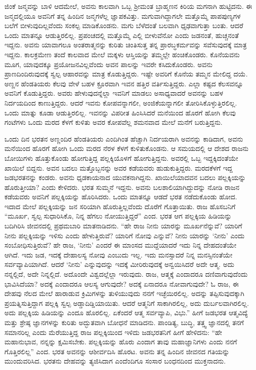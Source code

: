 ಜಿಂಕೆ ಜನ್ಮವನ್ನು ಬಾಳಿ ಆದಮೇಲೆ, ಅವನು ಕಾಲವಾಗಿ ಒಬ್ಬ ಶ‍್ರೀಮಂತ ಬ್ರಾಹ್ಮಣನ ಕಿರಿಯ ಮಗನಾಗಿ ಹುಟ್ಟಿದನು. ಈ ಜನ್ಮದಲ್ಲಿಯೂ ಅವನಿಗೆ ತನ್ನ ಹಿಂದಿನ ಜನ್ಮಗಳೆಲ್ಲ ಜ್ಞಾಪಕವಿತ್ತು. ಮಗುವಾಗಿದ್ದಾಗಲೇ ಮತ್ತೊಮ್ಮೆ ಪಾಪಪುಣ್ಯಗಳ ಬಲೆಗೆ ಬೀಳುವು\-ದಿಲ್ಲವೆಂದು ಸಂಕಲ್ಪ ಮಾಡಿಕೊಂಡನು. ಮಗು ಬೆಳೆದಂತೆ ಬಲವಾಗಿ ಧೃಢವಾಗುತ್ತಾ ಬಂತು. ಆದರೆ ಒಂದು ಮಾತನ್ನೂ ಆಡುತ್ತಿರಲಿಲ್ಲ. ಪ್ರಪಂಚದಲ್ಲಿ ಮತ್ತೊಮ್ಮೆ ಎಲ್ಲಿ ಬೀಳುವೆನೋ ಎಂದು ಜಡನಂತೆ, ಹುಚ್ಚನಂತೆ ಇದ್ದನು. ಅವನು ಯಾವಾಗಲೂ ಅಂತರಾತ್ಮನನ್ನು ಕುರಿತು ಚಿಂತಿಸುತ್ತ ತನ್ನ ಪ್ರಾರಬ್ಧಕರ್ಮವನ್ನು ಸವೆಸುವುದಕ್ಕೆ ಮಾತ್ರ ಇದ್ದನು. ಕಾಲಕ್ರಮೇಣ ತಂದೆ ಕಾಲವಾದ ಮೇಲೆ ಮಕ್ಕಳು ಆಸ್ತಿಯನ್ನು ತಮ್ಮಲ್ಲೇ ಹಂಚಿಕೊಂಡರು. ಕೊನೆಯವನು ಮೂಗ, ಯಾವುದಕ್ಕೂ ಪ್ರಯೋಜನವಿಲ್ಲವೆಂದು ಅವನ ಪಾಲನ್ನು ಇವರೇ ಕಸಿದುಕೊಂಡರು. ಅವನು ಪ್ರಾಣದಿಂದಿರುವುದಕ್ಕೆ ಸ್ವಲ್ಪ ಆಹಾರವನ್ನು ಮಾತ್ರ ಕೊಡು\-ತ್ತಿದ್ದರು. ಇಷ್ಟೇ ಅವರಿಗೆ ಕೊನೆಯ ತಮ್ಮನ ಮೇಲಿದ್ದ ದಯೆ. ಅಣ್ಣನ ಹೆಂಡತಿಯರು ಕೆಲವು ವೇಳೆ ಬಹಳ ಕ್ರೂರವಾಗಿ ಇವನ ಹತ್ತಿರ ವರ್ತಿಸುತ್ತಿದ್ದರು. ಎಲ್ಲಾ ಕಷ್ಟದ ಕೆಲಸವನ್ನೂ ಅವನಿಗೆ ಕೊಡುತ್ತಿದ್ದರು. ಅವರು ಹೇಳುವುದನ್ನೆಲ್ಲಾ ಇವನಿಗೆ ಮಾಡಲು ಅಸಾಧ್ಯವಾದರೆ ಅವನನ್ನು ಬಹಳ ನಿರ್ದಯದಿಂದ ಕಾಣುತ್ತಿದ್ದರು. ಆದರೆ ಇವನು ಕೋಪವನ್ನಾಗಲೀ, ಅಂಜಿಕೆಯನ್ನಾಗಲೀ ತೋರಿಸಿಕೊಳ್ಳುತ್ತಿರಲಿಲ್ಲ. ಒಂದು ಮಾತ್ನು ಕೂಡಾ ಆಡುತ್ತಿರಲಿಲ್ಲ. ಇವನನ್ನು ವಿಪರೀತ ಹಿಂಸಿಸಿದರೆ ಮನೆಯಿಂದ ಹೊರಗೆ ಹೋಗಿ ಕೆಲವು ಗಂಟೆಗಳು ಒಂದು ಮರದ ಕೆಳಗೆ ಕುಳಿತು ಅವರ ಕೋಪವೆಲ್ಲ ಶಮನವಾದ ಮೇಲೆ ಮನೆಗೆ ಬರುತ್ತಿದ್ದನು.

ಒಂದು ದಿನ ಭರತನ ಅಣ್ಣಂದಿರ ಹೆಂಡತಿಯರು ಎಂದಿಗಿಂತ ಹೆಚ್ಚಾಗಿ ನಿರ್ದಯರಾಗಿ ಅವನನ್ನು ಕಾಡಿದಾಗ, ಅವನು ಮನೆಯಿಂದ ಹೊರಗೆ ಹೋಗಿ ಒಂದು ಮರದ ನೆರಳ ಕೆಳಗೆ ಕುಳಿತುಕೊಂಡನು. ಆ ಸಮಯದಲ್ಲಿ ಆ ದೇಶದ ರಾಜನು ಬೋಯಿಗಳು ಹೊತ್ತುಕೊಂಡು ಹೋಗುತ್ತಿದ್ದ ಪಲ್ಲಕ್ಕಿಯೊಳಗೆ ಹೋಗುತ್ತಿದ್ದನು. ಅವರಲ್ಲಿ ಒಬ್ಬ ಇದ್ದಕ್ಕಿದಂತೆಯೇ ಖಾಯಿಲೆ ಬಿದ್ದನು. ಅವನ ಬದಲು ಮತ್ತೊಬ್ಬನನ್ನು ಅವರ ಕಡೆಯವರು ಹುಡುಕುತ್ತಿದ್ದರು. ಮರದಕೆಳಗೆ ಇದ್ದ ಜಡಭರತನನ್ನು ಕಂಡರು. ಅವನು ಧೃಡಕಾಯನಾದ ಯುವಕನಾಗಿದ್ದನು. ಖಾಯಿಲೆಯಾದವನ ಬದಲು ಪಲ್ಲಕ್ಕಿಯನ್ನು ಹೊರುತ್ತೀಯಾ? ಎಂದು ಕೇಳಿದರು. ಭರತ ಸುಮ್ಮನೆ ಇದ್ದನು. ಅವನು ಬಲಶಾಲಿಯಾಗಿದ್ದುದನ್ನು ನೋಡಿ ರಾಜನ ಕಡೆಯವರು ಅವನಿಗೆ ಪಲ್ಲಕ್ಕಿಯನ್ನು ಹೊರಿಸಿದರು. ಒಂದು ಮಾತನ್ನೂ ಆಡದೆ ಭರತ ನಡೆದುಕೊಂಡು ಹೋದ. ಇದಾದ ಮೇಲೆ ಪಲ್ಲಕ್ಕಿಯನ್ನು ಜನ ಸರಿಯಾಗಿ ಹೊರುತ್ತಿಲ್ಲವೆಂದು ದೊರೆಗೆ ಗೊತ್ತಾಯಿತು. ರಾಜ ಹೊಸಬನಿಗೆ “ಮೂರ್ಖ, ಸ್ವಲ್ಪ ಸುಧಾರಿಸಿಕೊ, ನಿನ್ನ ಹೆಗಲು ನೋಯುತ್ತಿದ್ದರೆ” ಎಂದ. ಭರತ ಆಗ ಪಲ್ಲಕ್ಕಿಯ ಹಿಡಿಯನ್ನು ಬದಿಗಿರಿಸಿ ಜೀವನದಲ್ಲಿ ಪ್ರಥಮಬಾರಿ ಮಾತನಾಡಿದನು. “ಹೇ ರಾಜ ನೀನು ಯಾರನ್ನು ಮೂರ್ಖನೆನ್ನುವೆ? ಯಾರಿಗೆ ನೀನು ಪಲ್ಲಕ್ಕಿಯನ್ನು ಇಳಿಸು ಎಂದು ಹೇಳುತ್ತಿರುವೆ? ಯಾರಿಗೆ ನೋವು ಎನ್ನುವೆ? ನೀನು ಯಾರನ್ನು ‘ನೀನು’ ಎಂದು ಸಂಬೋಧಿಸುತ್ತಿರುವೆ? ಹೇ ರಾಜ, ‘ನೀನು’ ಎಂದರೆ ಈ ಮಾಂಸದ ಮುದ್ದೆಯಾದರೆ ಇದು ನಿನ್ನ ದೇಹದಂತೆಯೇ ಆಗಿದೆ. ಇದು ಜಡ, ಇದಕ್ಕೆ ದೇಹಾಲಸ್ಯ ನೋವು ಎಂಬುದು ಇಲ್ಲ. ಇದು ಮನಸ್ಸಾದರೆ ನಿನ್ನ ಮನಸ್ಸಿನಂತೆಯೇ ಸರ್ವವ್ಯಾಪಿಯಾಗಿದೆ. ಆದರೆ ‘ನೀನು’ ಎನ್ನುವುದನ್ನು ಇದಕ್ಕೆ ಮೀರಿರುವುದಕ್ಕೆ ಅನ್ವಯಿಸಿದರೆ ಅದೇ ಆತ್ಮ. ಅದು ನನ್ನಲ್ಲಿದೆ, ಅದೇ ನಿನ್ನಲ್ಲಿದೆ. ಅದೊಂದೇ ವಿಶ್ವದಲ್ಲೆಲ್ಲಾ ಇರುವುದು. ರಾಜ, ಆತ್ಮಕ್ಕೆ ಎಂದಾದರೂ ದಣಿವಾಗುವುದೆಂದು ಭಾವಿಸಿದೆಯಾ? ಅದಕ್ಕೆ ಎಂದಾದರೂ ಆಲಸ್ಯ ಆಗುವುದೇ? ಅದಕ್ಕೆ ಏನಾದರೂ ನೋವಾಗುವುದೇ? ಓ ರಾಜ, ಈ ದೇಹವು ನೆಲದ ಮೇಲೆ ಹಾರಾಡುವ ಕ್ರಿಮಿಗಳನ್ನು ತುಳಿಯುವುದು ನನಗೆ ಇಚ್ಛೆಯಿರಲಿಲ್ಲ. ಅದನ್ನು ತಪ್ಪಿಸುವುದಕ್ಕಾಗಿ ಪ್ರಯತ್ನಿಸುತ್ತಿದ್ದಾಗ ಪಲ್ಲಕ್ಕಿ ಸ್ವಲ್ಪ ಅಡ್ಡಾದಿಡ್ಡಿಯಾಯಿತು. ಆದರೆ ಆತ್ಮನಿಗೆ ಸಾಕಾಗಿರಲಿಲ್ಲ, ಅದು ದುರ್ಬಲವಾಗಿರಲಿಲ್ಲ. ಅದು ಪಲ್ಲಕ್ಕಿಯ ಹಿಡಿಯನ್ನು ಎಂದೂ ಹೊರಲಿಲ್ಲ. ಏಕೆಂದರೆ ಆತ್ಮ ಸರ್ವವ್ಯಾಪಿ, ವಿಭು.” ಹೀಗೆ ಜಡಭರತ ಆತ್ಮವಿದ್ಯೆ ಮತ್ತು ಶ್ರೇಷ್ಠ ಜ್ಞಾನಗಳನ್ನು ಕುರಿತು ಅದ್ಭುತವಾಗಿ ಬೋಧನೆ ಮಾಡಿದನು. ಪಾಂಡಿತ್ಯ, ಬುದ್ಧಿ, ತತ್ತ್ವ ಜ್ಞಾನದಲ್ಲಿ ತನಗೆ ಸಮಾನರಿಲ್ಲ ಎಂದು ಮೆರೆಯುತ್ತಿದ್ದ ರಾಜ ಪಲ್ಲಕ್ಕಿಯಿಂದ ಇಳಿದು ಜಡಭರತನಿಗೆ ಹೀಗೆ ಹೇಳಿದನು: “ಹೇ ಮಹಾನುಭಾವ, ನನ್ನನ್ನು ಕ್ಷಮಿಸಬೇಕು. ಪಲ್ಲಕ್ಕಿಯನ್ನು ಹೊರು ಎಂದಾಗ ತಾವು ಮಹಾಜ್ಞಾನಿಗಳು ಎಂದು ನನಗೆ ಗೊತ್ತಿರಲಿಲ್ಲ” ಎಂದ. ಭರತ ಅವನನ್ನು ಆಶೀರ್ವದಿಸಿ ಹೊರಟ. ಅವನು ತನ್ನ ಹಿಂದಿನ ಜೀವನದ ಗತಿಯನ್ನು ಮುಂದುವರಿಸಿದ. ಭರತನು ದೇಹವನ್ನು ತ್ಯಜಿಸಿದಾಗ ಎಂದೆಂದಿಗೂ ಸಂಸಾರ ಬಂಧನದಿಂದ ಮುಕ್ತನಾದನು.

